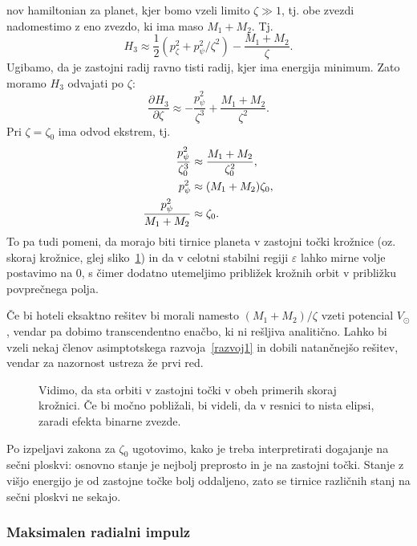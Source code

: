 \documentclass[12pt, a4paper]{article}
\newcommand{\der}[3][]{
    \ensuremath{ \frac{\partial^{#1} #2}{\partial #3^{#1}} }
}
\begin{document}
nov hamiltonian za planet, kjer bomo vzeli limito $\zeta \gg 1$, tj. obe zvezdi nadomestimo z eno zvezdo, ki
ima maso $M_1 + M_2$. Tj.
\begin{equation}
	H_3 \approx \frac{1}{2}(p_\zeta^2 + p_\psi^2/\zeta^2) - \frac{M_1 + M_2}{\zeta}.
\end{equation}
Ugibamo, da je zastojni radij ravno tisti radij, kjer ima energija minimum. Zato moramo $H_3$ odvajati po $\zeta$:
\begin{equation}
	\der{H_3}{\zeta} \approx -\frac{p_\psi^2}{\zeta^3} + \frac{M_1 + M_2}{\zeta^2}.
\end{equation}
Pri $\zeta = \zeta_0$ ima odvod ekstrem, tj.
\begin{align}
	\frac{p_\psi^2}{\zeta_0^3} &\approx \frac{M_1 + M_2}{\zeta_0^2}, \notag \\
	p_\psi^2 &\approx (M_1 + M_2)\zeta_0, \notag \\
	\frac{p_\psi^2}{M_1 + M_2} &\approx \zeta_0.
\end{align}
To pa tudi pomeni, da morajo biti tirnice planeta v zastojni to\v cki kro\v znice (oz. skoraj kro\v znice,
glej sliko~\ref{krog}) in da v celotni stabilni regiji $\varepsilon$ lahko mirne volje postavimo na 0, s \v cimer
dodatno utemeljimo pribli\v zek kro\v znih orbit v pribli\v zku povpre\v cnega polja.

\v Ce bi hoteli eksaktno re\v sitev bi morali namesto $(M_1 + M_2)/\zeta$ vzeti potencial $V_\odot$,
vendar pa dobimo transcendentno ena\v cbo, ki ni re\v sljiva analiti\v cno. Lahko bi vzeli nekaj \v clenov
asimptotskega razvoja~\eqref{razvoj1} in dobili natan\v cnej\v so re\v sitev, vendar za nazornost ustreza
\v ze prvi red.
\begin{figure}[H]\centering
	
	\caption{Vidimo, da sta orbiti v zastojni to\v cki v obeh primerih skoraj kro\v znici. \v Ce bi mo\v cno
		pobli\v zali, bi videli, da v resnici to nista elipsi, zaradi efekta binarne zvezde.}
	\label{krog}
\end{figure}
Po izpeljavi zakona za $\zeta_0$ ugotovimo, kako je treba interpretirati dogajanje na se\v cni ploskvi:
osnovno stanje je nejbolj preprosto in je na zastojni to\v cki. Stanje z vi\v sjo energijo je od
zastojne to\v cke bolj oddaljeno, zato se tirnice razli\v cnih stanj na se\v cni ploskvi ne sekajo.

\subsubsection{Maksimalen radialni impulz}
\end{document}
